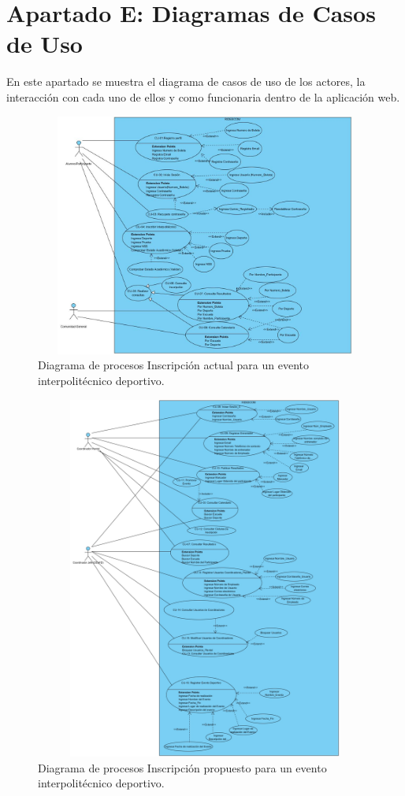 	\chapter{Apartado E: Diagramas de Casos de Uso}
	\noindent En este apartado se muestra el diagrama de casos de uso de los actores, la interacción con cada uno de ellos y como funcionaria dentro de la aplicación web.
		\begin{figure}[hbt!]
			\centering
			\includegraphics[width=16cm, height=8cm]{Imagenes/Disenos/DiagramasCU/Alumno.jpg}
			\caption{Diagrama de procesos Inscripción actual para un evento interpolitécnico deportivo.}
			\label{Inscripcion}
		\end{figure}
	\pagebreak
		\begin{figure}[hbt!]
			\centering
			\includegraphics[width=16cm, height=12cm]{Imagenes/Disenos/DiagramasCU/CoordinadoresFinal.jpg}
			\caption{Diagrama de procesos Inscripción propuesto para un evento interpolitécnico deportivo.}
			\label{Inscripcion}
		\end{figure}
	
